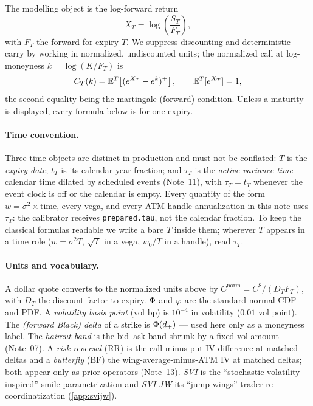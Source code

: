 \documentclass[11pt]{article}
\begin{document}
The modelling object is the log-forward return
\begin{equation}
X_T=\log\!\left(\frac{S_T}{F_T}\right),
\end{equation}
with $F_T$ the forward for expiry $T$. We suppress discounting and deterministic
carry by working in normalized, undiscounted units; the normalized call at
log-moneyness $k=\log(K/F_T)$ is
\begin{equation}
C_T(k)=\mathbb{E}^{T}\!\left[(e^{X_T}-e^{k})^+\right],
\qquad \mathbb{E}^{T}[e^{X_T}]=1,
\label{eq:call_def}
\end{equation}
the second equality being the martingale (forward) condition. Unless a maturity
is displayed, every formula below is for one expiry.

\paragraph{Time convention.} Three time objects are distinct in production and
must not be conflated: $T$ is the \emph{expiry date}; $t_T$ is its calendar
year fraction; and $\tau_T$ is the \emph{active variance time} --- calendar
time dilated by scheduled events (Note~11), with $\tau_T=t_T$ whenever the
event clock is off or the calendar is empty. Every quantity of the form
$w=\sigma^2\times\text{time}$, every vega, and every ATM-handle annualization
in this note uses $\tau_T$: the calibrator receives \texttt{prepared.tau}, not
the calendar fraction. To keep the classical formulas readable we write a bare
$T$ inside them; wherever $T$ appears in a time role
($w=\sigma^2T$, $\sqrt T$ in a vega, $w_0/T$ in a handle), read $\tau_T$.

\paragraph{Units and vocabulary.} A dollar quote converts to the normalized
units above by $C^{\text{norm}}=C^{\$}/(D_TF_T)$, with $D_T$ the discount
factor to expiry. $\Phi$ and $\varphi$ are the standard normal CDF and PDF. A
\emph{volatility basis point} (vol bp) is $10^{-4}$ in volatility ($0.01$ vol
point). The \emph{(forward Black) delta} of a strike is $\Phi(d_+)$ --- used
here only as a moneyness label. The \emph{haircut band} is the bid--ask band
shrunk by a fixed vol amount (Note~07). A \emph{risk reversal} (RR) is the
call-minus-put IV difference at matched deltas and a \emph{butterfly} (BF) the
wing-average-minus-ATM IV at matched deltas; both appear only as prior
operators (Note~13). \emph{SVI} is the ``stochastic volatility inspired''
smile parametrization and \emph{SVI-JW} its ``jump-wings'' trader
re-coordinatization (\cref{app:svijw}).
\end{document}
